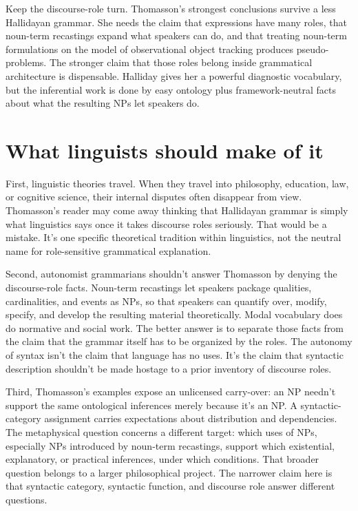 \documentclass[12pt]{article}
\begin{document}
Keep the discourse-role turn. Thomasson's strongest conclusions survive a less Hallidayan grammar. She needs the claim that expressions have many roles, that noun-term recastings expand what speakers can do, and that treating noun-term formulations on the model of observational object tracking produces pseudo-problems. The stronger claim that those roles belong inside grammatical architecture is dispensable. Halliday gives her a powerful diagnostic vocabulary, but the inferential work is done by easy ontology plus framework-neutral facts about what the resulting NPs let speakers do.

\section{What linguists should make of it}
First, linguistic theories travel. When they travel into philosophy, education, law, or cognitive science, their internal disputes often disappear from view. Thomasson's reader may come away thinking that Hallidayan grammar is simply what linguistics says once it takes discourse roles seriously. That would be a mistake. It's one specific theoretical tradition within linguistics, not the neutral name for role-sensitive grammatical explanation.

Second, autonomist grammarians shouldn't answer Thomasson by denying the discourse-role facts. Noun-term recastings let speakers package qualities, cardinalities, and events as NPs, so that speakers can quantify over, modify, specify, and develop the resulting material theoretically. Modal vocabulary does do normative and social work. The better answer is to separate those facts from the claim that the grammar itself has to be organized by the roles. The autonomy of syntax isn't the claim that language has no uses. It's the claim that syntactic description shouldn't be made hostage to a prior inventory of discourse roles.

Third, Thomasson's examples expose an unlicensed carry-over: an NP needn't support the same ontological inferences merely because it's an NP. A syntactic-category assignment carries expectations about distribution and dependencies. The metaphysical question concerns a different target: which uses of NPs, especially NPs introduced by noun-term recastings, support which existential, explanatory, or practical inferences, under which conditions. That broader question belongs to a larger philosophical project. The narrower claim here is that syntactic category, syntactic function, and discourse role answer different questions.
\end{document}
